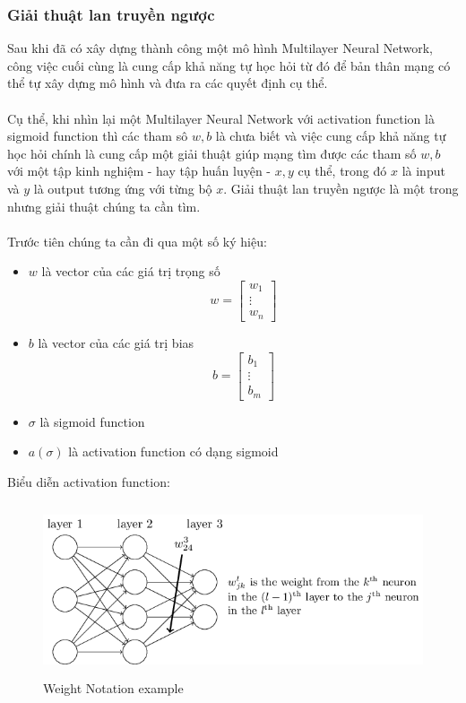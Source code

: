 \subsubsection{Giải thuật lan truyền ngược}
Sau khi đã có xây dựng thành công một mô hình Multilayer Neural Network, công 
việc cuối cùng là cung cấp khả năng tự học hỏi từ đó để bản thân mạng có thể 
tự xây dựng mô hình và đưa ra các quyết định cụ thể.\\\\
Cụ thể, khi nhìn lại một Multilayer Neural Network với activation function là 
sigmoid function thì các tham sô $w, b$ là chưa biết và việc cung cấp khả năng 
tự học hỏi chính là cung cấp một giải thuật giúp mạng tìm được các tham số 
$w, b$ với một tập kinh nghiệm - hay tập huấn luyện - ${x, y}$ cụ thể, trong 
đó $x$ là input và $y$ là output tương ứng với từng bộ $x$. Giải thuật lan truyền 
ngược là một trong nhưng giải thuật chúng ta cần tìm.\\\\
Trước tiên chúng ta cần đi qua một số ký hiệu:
\begin{itemize}
\item $w$ là vector của các giá trị trọng số\\ 
\[ w =
\begin{bmatrix}
w_1\\
\vdots\\
w_n
\end{bmatrix}
\]
\item $b$ là vector của các giá trị bias\\ 
\[ b =
\begin{bmatrix}
b_1\\
\vdots\\
b_m
\end{bmatrix}
\]
\item $\sigma$ là sigmoid function
\item $a(\sigma)$ là activation function có dạng sigmoid
\end{itemize}
Biểu diễn activation function:\\
\begin{figure}[h!]
\centering
\includegraphics[height=2in, keepaspectratio=true]{exw.png}
\caption{Weight Notation example}
\end{figure}\\
